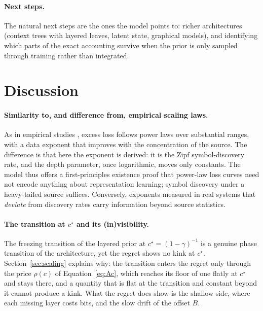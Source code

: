 \documentclass[11pt]{article}
\newcommand{\price}{\rho}            %
\begin{document}
\paragraph{Next steps.}
The natural next steps are the ones the model points to: richer
architectures (context trees with layered leaves, latent state, graphical models), and
identifying which parts of the exact accounting survive when the prior is
only sampled through training rather than integrated.


\section{Discussion}
\label{sec:discussion}
\paragraph{Similarity to, and difference from, empirical scaling laws.}
As in empirical studies \cite{kaplan2020scaling}, excess loss follows power
laws over substantial ranges, with a data exponent that improves
with the concentration of the source.  The difference is that here the
exponent is derived: it is the Zipf symbol-discovery rate, and the depth
parameter, once logarithmic, moves only constants.  The model thus offers a
first-principles existence proof that power-law loss curves need not encode
anything about representation learning; symbol discovery under a heavy-tailed
source suffices.  Conversely, exponents measured in real systems that
\emph{deviate} from discovery rates carry information beyond source
statistics.
\paragraph{The transition at \(c^\star\) and its (in)visibility.}
The freezing transition of the layered prior at
\(c^\star=(1-\gamma)^{-1}\)
\cite{jeong2026phase,derrida1981random,bovier2006statistical} is a
genuine phase transition of the architecture, yet the regret shows no
kink at \(c^\star\).  
Section~\ref{sec:scaling} explains why: the transition enters the regret
only through the price \(\price(c)\) of Equation~\eqref{eq:Ac}, which
reaches its floor of one flatly at \(c^\star\) and stays there, and a
quantity that is flat at the transition and constant beyond it cannot
produce a kink.
What the regret does show is the shallow side, where each missing
layer costs bits, and the slow drift of the offset \(B\).  
\end{document}
